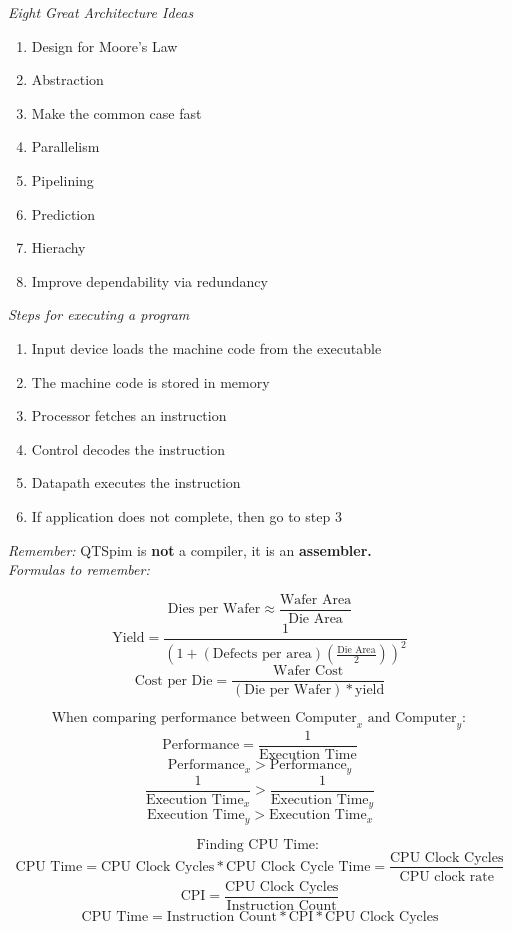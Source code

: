 \documentclass{book}
\begin{document}
	\noindent \emph{Eight Great Architecture Ideas}
	\begin{enumerate}
		  \item Design for Moore's Law
		  \item Abstraction
		  \item Make the common case fast
		  \item Parallelism
		  \item Pipelining
		  \item Prediction
		  \item Hierachy
  		\item Improve dependability via redundancy
	\end{enumerate}

	\noindent \emph{Steps for executing a program}
	\begin{enumerate}
  		\item Input device loads the machine code from the executable
  		\item The machine code is stored in memory
  		\item Processor fetches an instruction
  		\item Control decodes the instruction
  		\item Datapath executes the instruction
  		\item If application does not complete, then go to step 3
	\end{enumerate}

	\noindent \emph{Remember: }QTSpim is \textbf{not} a compiler, it is an \textbf{assembler.}\\

	\noindent \emph{Formulas to remember: }\\
	\begin{center}
		$$\text{Dies per Wafer} \approx \frac{\text{Wafer Area}}{\text{Die Area}}$$
		$$\text{Yield} = \frac{1}{(1 + (\text{Defects per area})(\frac{\text{Die Area}}{2}))^2} $$
		$$\text{Cost per Die} = \frac{\text{Wafer Cost}}{(\text{Die per Wafer}) * \text{yield}}$$
		
		$$ \text{When comparing performance between } \text{Computer}_x \text{ and } \text{Computer}_y:$$
		$$ \text{Performance} = \frac{1}{\text{Execution Time}}$$
		$$ \text{Performance}_x > \text{Performance}_y $$
		$$ \frac{1}{\text{Execution Time}_x} >  \frac{1}{\text{Execution Time}_y}$$
		$$ \text{Execution Time}_y  > \text{Execution Time}_x $$

		$$ \text{Finding CPU Time: } $$
		$$ \text{CPU Time} = \text{CPU Clock Cycles} * \text{CPU Clock Cycle Time} = \frac{\text{CPU Clock Cycles}}{\text{CPU clock rate}} $$
		$$ \text{CPI} = \frac{\text{CPU Clock Cycles}}{\text{Instruction Count}} $$
		$$ \text{CPU Time} = \text{Instruction Count} * \text{CPI} * \text{CPU Clock Cycles} $$ \\
	\end{center}
\end{document}
